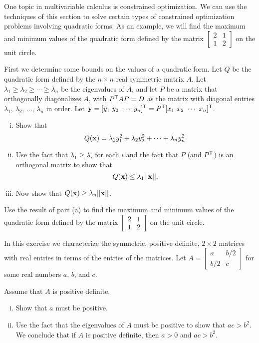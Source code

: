 \item \label{ex:7_b_constrained_optimization} One topic in multivariable calculus is constrained optimization. We can use the techniques of this section to solve certain types of constrained optimization problems involving quadratic forms. As an example, we will find the maximum and minimum values of the quadratic form defined by the matrix $\left[ \begin{array}{cc} 2&1\\1&2 \end{array} \right]$ on the unit circle. 
	\ba
	\item First we determine some bounds on the values of a quadratic form.  Let $Q$ be the quadratic form defined by the $n \times n$ real symmetric matrix $A$. Let $\lambda_1 \geq \lambda_2 \geq \cdots \geq \lambda_n$ be the eigenvalues of $A$, and let $P$ be a matrix that orthogonally diagonalizes $A$, with $P^{\mathsf{T}}AP = D$ as the matrix with diagonal entries $\lambda_1$, $\lambda_2$, $\ldots$, $\lambda_n$ in order. Let $\vy = [y_1 \ y_2 \  \cdots \ y_n]^{\tr} = P^{\tr} [x_1 \ x_2 \ \cdots \ x_n]^{\tr}$. 
		\begin{enumerate}[i.]
		\item Show that 
	\[Q(\mathbf{x}) = \lambda_1 y_1^2 + \lambda_2 y_2^2 + \cdots + \lambda_n y_n^2.\]
	

		\item Use the fact that $\lambda_1 \geq \lambda_i$ for each $i$ and the fact that $P$ (and $P^{\mathsf{T}}$) is an orthogonal matrix to show that 
\[Q(\mathbf{x}) \leq  \lambda_1 ||\mathbf{x}||.\]


		\item Now show that $Q(\mathbf{x}) \geq  \lambda_n ||\mathbf{x}||$.

		\end{enumerate}
		
	\item Use the result of part (a) to find the maximum and minimum values of the quadratic form defined by the matrix $\left[ \begin{array}{cc} 2&1\\1&2 \end{array} \right]$ on the unit circle. 
	
	\ea
 
\item In this exercise we characterize the symmetric, positive definite, $2 \times 2$ matrices with real entries in terms of the entries of the matrices. Let $A = \left[ \begin{array}{cc} a&b/2\\b/2&c \end{array} \right]$ for some real numbers $a$, $b$, and $c$. 
	\ba
	\item Assume that $A$ is positive definite.
		\begin{enumerate}[i.]
		\item Show that $a$ must be positive.


		\item Use the fact that the eigenvalues of $A$ must be positive to show that $ac > b^2$. We conclude that if $A$ is positive definite, then $a> 0$ and $ac > b^2$.

		
		\end{enumerate}
	
